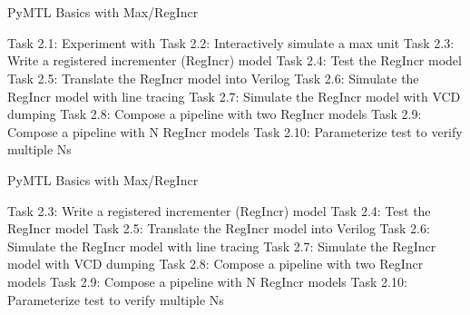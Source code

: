 
\section[{\it Hands-On} Max/RegIncr]{}

\begin{frame}{ PyMTL Basics with Max/RegIncr}
\begin{cbxlist}
  \1 Task 2.1: Experiment with 
  \1 Task 2.2: Interactively simulate a max unit
  \1 Task 2.3: Write a registered incrementer (RegIncr) model
  \1 Task 2.4: Test the RegIncr model
  \1 Task 2.5: Translate the RegIncr model into Verilog
  \1 Task 2.6: Simulate the RegIncr model with line tracing
  \1 Task 2.7: Simulate the RegIncr model with VCD dumping
  \1 Task 2.8: Compose a pipeline with two RegIncr models
  \1 Task 2.9: Compose a pipeline with N RegIncr models
  \1 Task 2.10: Parameterize test to verify multiple Ns
\end{cbxlist}
\end{frame}

\begin{frame}{ PyMTL Basics with Max/RegIncr}
\begin{cbxlist}
  \1 
  \1 
  \1 Task 2.3: Write a registered incrementer (RegIncr) model
  \1 Task 2.4: Test the RegIncr model
  \1 Task 2.5: Translate the RegIncr model into Verilog
  \1 Task 2.6: Simulate the RegIncr model with line tracing
  \1 Task 2.7: Simulate the RegIncr model with VCD dumping
  \1 Task 2.8: Compose a pipeline with two RegIncr models
  \1 Task 2.9: Compose a pipeline with N RegIncr models
  \1 Task 2.10: Parameterize test to verify multiple Ns
\end{cbxlist}
\end{frame}

